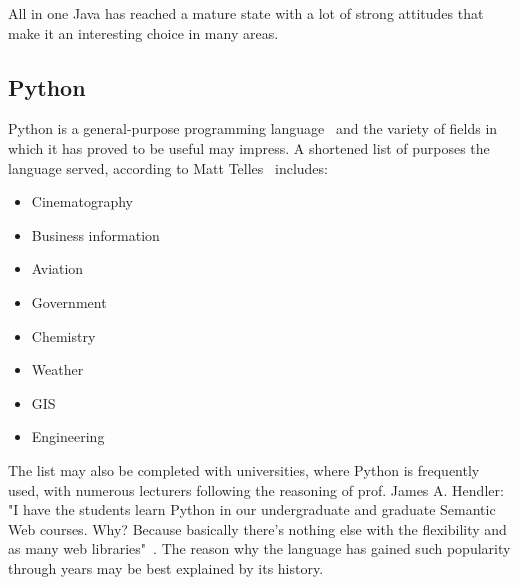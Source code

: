 All in one Java has reached a mature state with a lot of strong attitudes that make it an interesting choice in many areas.

\subsection{Python}\label{subsec:py}
Python is a general-purpose programming language~\cite[page 3]{py_nutshell} and the variety of fields in which it has proved to be useful may impress. A shortened list of purposes the language served, according to Matt Telles~\cite[page 13]{py_power} includes:
\begin{itemize}
\item{Cinematography}
\item{Business information}
\item{Aviation}
\item{Government}
\item{Chemistry}
\item{Weather}
\item{GIS}
\item{Engineering}
\end{itemize}
The list may also be completed with universities, where Python is frequently used, with numerous lecturers following the reasoning of prof. James A. Hendler: "I have the students learn Python in our undergraduate and graduate Semantic Web courses. Why? Because basically there's nothing else with the flexibility and as many web libraries"~\cite{py_quote}. The reason why the language has gained such popularity through years may be best explained by its history.

